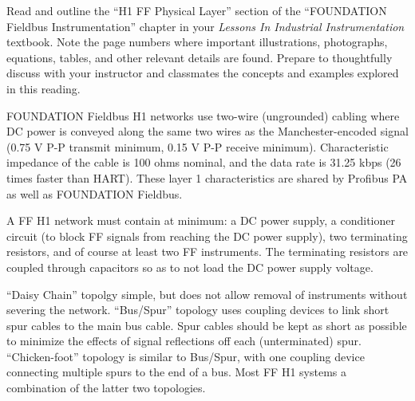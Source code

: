 

Read and outline the ``H1 FF Physical Layer'' section of the ``FOUNDATION Fieldbus Instrumentation'' chapter in your {\it Lessons In Industrial Instrumentation} textbook.  Note the page numbers where important illustrations, photographs, equations, tables, and other relevant details are found.  Prepare to thoughtfully discuss with your instructor and classmates the concepts and examples explored in this reading.














FOUNDATION Fieldbus H1 networks use two-wire (ungrounded) cabling where DC power is conveyed along the same two wires as the Manchester-encoded signal (0.75 V P-P transmit minimum, 0.15 V P-P receive minimum).  Characteristic impedance of the cable is 100 ohms nominal, and the data rate is 31.25 kbps (26 times faster than HART).  These layer 1 characteristics are shared by Profibus PA as well as FOUNDATION Fieldbus.

\vskip 10pt

A FF H1 network must contain at minimum: a DC power supply, a conditioner circuit (to block FF signals from reaching the DC power supply), two terminating resistors, and of course at least two FF instruments.  The terminating resistors are coupled through capacitors so as to not load the DC power supply voltage.

\vskip 10pt

``Daisy Chain'' topolgy simple, but does not allow removal of instruments without severing the network.  ``Bus/Spur'' topology uses coupling devices to link short spur cables to the main bus cable.  Spur cables should be kept as short as possible to minimize the effects of signal reflections off each (unterminated) spur.  ``Chicken-foot'' topology is similar to Bus/Spur, with one coupling device connecting multiple spurs to the end of a bus.  Most FF H1 systems a combination of the latter two topologies.

